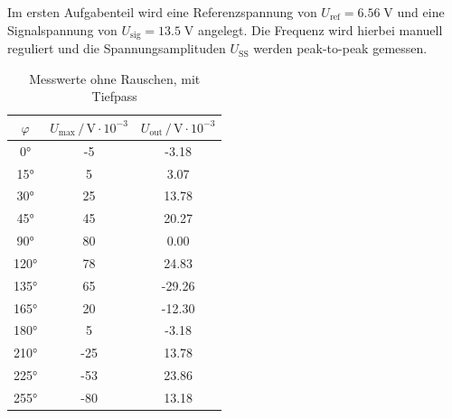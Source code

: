 Im ersten Aufgabenteil wird eine Referenzspannung von $U_\text{ref}=6.56 \;\si{\volt}$
und eine Signalspannung von $U_\text{sig}=13.5 \;\si{\volt}$ angelegt.
Die Frequenz wird hierbei manuell reguliert und die Spannungsamplituden
$U_\text{SS}$ werden peak-to-peak gemessen.


\begin{table}[!h]
  \centering
    \begin{tabular}{S[table-format=4.0]SS}
      \toprule
      {$\varphi$} &
      {$U_\text{max} \,/\, \si{\volt}\cdot10^{-3}$} &
      {$U_\text{out} \,/\, \si{\volt}\cdot10^{-3}$} \\
      \si{\degree}    &    -5     &     -3.18 \\
     15\si{\degree}    &     5     &      3.07 \\
     30\si{\degree}    &    25     &     13.78 \\
     45\si{\degree}    &    45     &     20.27 \\
     90\si{\degree}    &    80     &      0.00 \\
    120\si{\degree}    &    78     &     24.83 \\
    135\si{\degree}    &    65     &    -29.26 \\
    165\si{\degree}    &    20     &    -12.30 \\
    180\si{\degree}    &    5      &     -3.18 \\
    210\si{\degree}    &    -25    &     13.78 \\
    225\si{\degree}    &    -53    &     23.86 \\
    255\si{\degree}    &    -80    &     13.18 \\
    \bottomrule
    \end{tabular}
    \caption{Messwerte ohne Rauschen, mit Tiefpass}
    \label{tab:b}
  \quad
  \hfill
\end{table}


